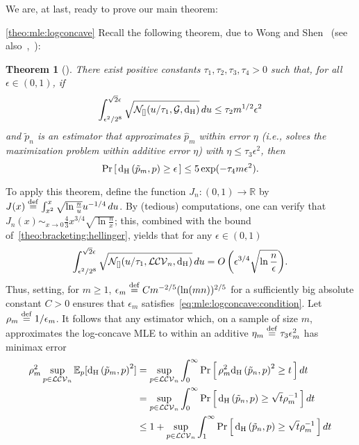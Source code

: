 \documentclass[11pt]{article}
\newtheorem{theorem}{Theorem}[section]
\theoremstyle{definition}
\newcommand{\R}{\mathbb{R}}
\newcommand{\eps}{\epsilon}
\newcommand{\eqdef}{\stackrel{{\mathrm {\footnotesize def}}}{=}}
\newcommand{\bigO}[1]{{O\left( #1 \right)}}
\newcommand{\classlogconcave}{\ensuremath{\mathcal{LCV}}\xspace}
\newcommand{\bracketing}[3][\operatorname{d}_{\rm H}]{\mathcal{N}_{[ ]}(#2,#3,#1)}
\newcommand{\hellinger}[2]{{\operatorname{d_{\rm{}H}}\left({#1, #2}\right)}}
\newcommand{\shortexpect}{\mathbb{E}}
\newcommand{\proba}{\Pr}
\newcommand{\probaOf}[1]{\proba\left[\, #1\, \right]}
\begin{document}
We are, at last, ready to prove our main theorem:
\begin{proofof}{\cref{theo:mle:logconcave}}
    Recall the following theorem, due to Wong and Shen~\cite{WS:95} (see also~\cite[Theorem 7.4]{vdG:00},~\cite[Theorem 17]{KS:16}):
    \begin{theorem}[{\cite[Theorem 2]{WS:95}}]
        There exist positive constants $\tau_1,\tau_2,\tau_3,\tau_4>0$ such that, for all $\eps\in(0,1)$, if
        \begin{equation}\label{eq:mle:logconcave:condition}
            \int_{\eps^2/2^8}^{\sqrt{2}\eps} \sqrt{\bracketing{u/\tau_1}{\mathcal{G}}}\, du \leq \tau_2 m^{1/2}\eps^2
        \end{equation}
        and $\tilde{p}_n$ is an estimator that approximates $\hat{p}_m$ within error $\eta$ (i.e., solves the maximization problem within additive error $\eta$) with $\eta \leq \tau_3\eps^2$, then
        \[
            \probaOf{ \hellinger{\tilde{p}_m}{p} \geq \eps } \leq 5\exp(-\tau_4 m \eps^2).
        \]
    \end{theorem}
    To apply this theorem, define the function $J_n\colon(0,1)\to\R$ by $J(x) \eqdef \int_{x^2}^x \sqrt{\ln\frac{n}{u}}u^{-1/4}\, du$. By (tedious) computations, one can verify that $J_n(x) \sim_{x\to 0} \frac{4}{3}x^{3/4}\sqrt{\ln\frac{n}{x}}$; this, combined with the bound of~\cref{theo:bracketing:hellinger}, yields that for any $\eps\in(0,1)$
    \[
        \int_{\eps^2/2^8}^{\sqrt{2}\eps} \sqrt{\bracketing{u/\tau_1}{\classlogconcave_n}}\, du = \bigO{\eps^{3/4}\sqrt{\ln\frac{n}{\eps}}}.
    \]
    Thus, setting, for $m\geq 1$, $\eps_m \eqdef C m^{-2/5}(\ln(mn))^{2/5}$ for a sufficiently big absolute constant $C>0$ ensures that $\eps_m$ satisfies~\eqref{eq:mle:logconcave:condition}. Let $\rho_{m} \eqdef 1/\eps_m$. It follows that any estimator which, on a sample of size $m$, approximates the log-concave MLE to within an additive $\eta_m\eqdef \tau_3\eps_m^2$ has minimax error
    \begin{align*}
        \rho^2_{m}\sup_{p\in\classlogconcave_n}\shortexpect_p[ \hellinger{\tilde{p}_m}{p}^2 ] &
        = \sup_{p\in\classlogconcave_n} \int_0^\infty {  \probaOf{ \rho^2_{m} \hellinger{\tilde{p}_n}{p}^2 \geq t } }\, dt \\
        &= \sup_{p\in\classlogconcave_n} \int_0^\infty {  \probaOf{  \hellinger{\tilde{p}_n}{p} \geq \sqrt{t}\rho^{-1}_{m} } }\, dt \\
        &\leq 1+ \sup_{p\in\classlogconcave_n} \int_1^\infty {  \probaOf{  \hellinger{\tilde{p}_n}{p} \geq \sqrt{t}\rho^{-1}_{m} } }\, dt \\

\end{align*}
\end{proofof}
\end{document}
